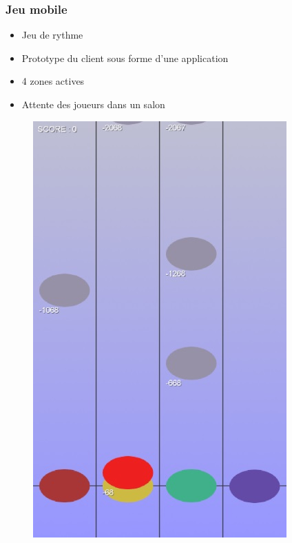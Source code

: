\begin{frame}
\frametitle{Jeu mobile}
\begin{multicols}{2} 
\begin{itemize}
\item Jeu de rythme
\item Prototype du client sous forme d'une application \android{}
\item 4 zones actives
\item Attente des joueurs dans un salon
\end{itemize} 
\columnbreak 
\begin{figure}
\includegraphics[scale=0.4]{images/jeu3.jpg}
\end{figure}
\end{multicols}
\end{frame}

